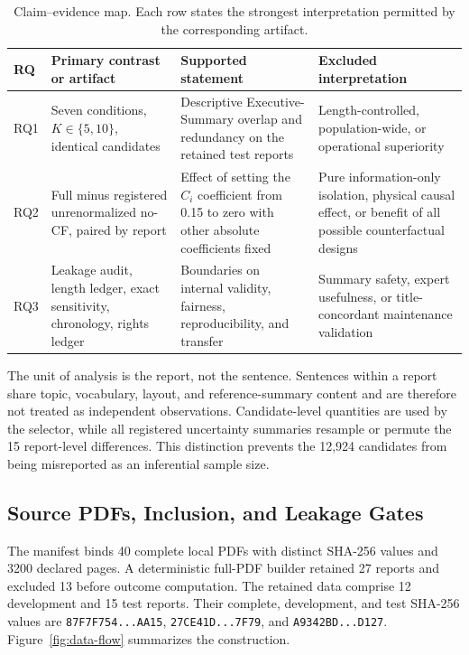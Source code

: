 \documentclass[applsci,article,submit,moreauthors]{Definitions/mdpi}
\begin{document}
\begin{table}[H]
\caption{Claim--evidence map. Each row states the strongest interpretation permitted by the corresponding artifact.}
\label{tab:claim-evidence-map}\centering\small
\begin{tabularx}{\textwidth}{p{1.1cm}p{3.2cm}p{4.1cm}X}
\toprule
RQ & Primary contrast or artifact & Supported statement & Excluded interpretation\\
\midrule
RQ1 & Seven conditions, $K\in\{5,10\}$, identical candidates & Descriptive Executive-Summary overlap and redundancy on the retained test reports & Length-controlled, population-wide, or operational superiority\\
RQ2 & Full minus registered unrenormalized no-CF, paired by report & Effect of setting the $C_i$ coefficient from 0.15 to zero with other absolute coefficients fixed & Pure information-only isolation, physical causal effect, or benefit of all possible counterfactual designs\\
RQ3 & Leakage audit, length ledger, exact sensitivity, chronology, rights ledger & Boundaries on internal validity, fairness, reproducibility, and transfer & Summary safety, expert usefulness, or title-concordant maintenance validation\\
\bottomrule
\end{tabularx}
\end{table}

The unit of analysis is the report, not the sentence. Sentences within a report share topic, vocabulary, layout, and reference-summary content and are therefore not treated as independent observations. Candidate-level quantities are used by the selector, while all registered uncertainty summaries resample or permute the 15 report-level differences. This distinction prevents the 12,924 candidates from being misreported as an inferential sample size.

\subsection{Source PDFs, Inclusion, and Leakage Gates}

The manifest binds 40 complete local PDFs with distinct SHA-256 values and 3200 declared pages. A deterministic full-PDF builder retained 27 reports and excluded 13 before outcome computation. The retained data comprise 12 development and 15 test reports. Their complete, development, and test SHA-256 values are \texttt{87F7F754...AA15}, \texttt{27CE41D...7F79}, and \texttt{A9342BD...D127}. Figure~\ref{fig:data-flow} summarizes the construction.
\end{document}
